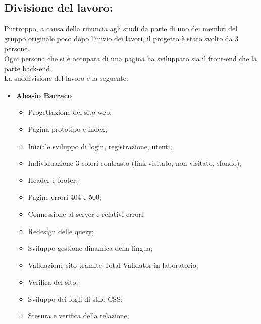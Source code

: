\documentclass[a4paper, 11pt]{article}
\begin{document}
\subsection{Divisione del lavoro:}
Purtroppo, a causa della rinuncia agli studi da parte di uno dei membri del gruppo originale poco dopo l'inizio dei lavori, il progetto è stato svolto da 3 persone. \\

Ogni persona che si è occupata di una pagina ha sviluppato sia il front-end che la parte back-end. \\
La suddivisione del lavoro è la seguente:

\begin{itemize}

\item \textbf{Alessio Barraco}
	\begin{itemize}
	\item Progettazione del sito web;
        \item Pagina prototipo e index;
        \item Iniziale sviluppo di login, registrazione, utenti;
        \item Individuazione 3 colori contrasto (link visitato, non visitato, sfondo);
        \item Header e footer;
        \item Pagine errori 404 e 500;
        \item Connessione al server e relativi errori;
        \item Redesign delle query;
        \item Sviluppo gestione dinamica della lingua;
        \item Validazione sito tramite Total Validator in laboratorio;
        \item Verifica del sito;
        \item Sviluppo dei fogli di stile CSS;
        \item Stesura e verifica della relazione;

	\end{itemize}

\pagebreak


\end{itemize}
\end{document}
